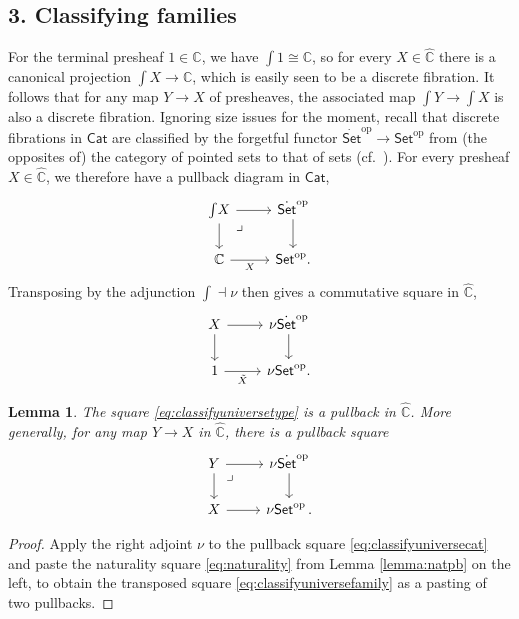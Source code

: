 \documentclass[11pt]{article}
\newcommand{\C}{\ensuremath{\mathbb{C}}}
\newcommand{\op}[1]{\ensuremath{{#1}^{\mathrm{op}}}}
\newcommand{\Set}{\ensuremath{\mathsf{Set}}}
\newcommand{\Cat}{\ensuremath{\mathsf{Cat}}}
\newcommand{\ra}{\ensuremath{\rightarrow}}
\renewcommand{\to}{\ensuremath{\rightarrow}}
\newcommand{\elem}[1]{\textstyle\int\!{#1}}
\newcommand{\pbmark}{\ar[dr, phantom, "\lrcorner" very near start, shift right=.5ex]}	%
\newtheorem{lemma}[theorem]{Lemma}
\theoremstyle{remark}
\theoremstyle{definition}
\begin{document}
\subsection*{3. Classifying families}

For the terminal presheaf $1\in\widehat{\C}$, we have $\elem{1} \cong\C$, so for every $X\in\widehat{\C}$ there is a canonical projection  $\elem X \ra\C$, which is easily seen to be a discrete fibration.  It follows that for any map $Y\to X$ of presheaves, the associated map $\elem Y \to \elem X$ is also a discrete fibration. 
Ignoring size issues for the moment, recall that discrete fibrations in $\Cat$ are classified by the forgetful functor $\op{\dot{\Set}}\to \op{\Set}$ from (the opposites of) the category of pointed sets to that of sets (cf.~\cite{W:2007}).  For every presheaf $X\in\widehat{\C}$, we therefore have a pullback diagram in $\Cat$,
\begin{equation}\label{eq:classifyuniversecat}\textstyle
\begin{tikzcd}
	 \elem X \ar[d] \ar[r] \pbmark & \op{\dot{\Set}} \ar[d]\\  
	\C \ar[r,swap,"X"] &  \op{\Set}.
 \end{tikzcd}
 \end{equation}
 Transposing by the adjunction $\int\dashv \nu$ then gives a commutative square in $\widehat{\C}$,
\begin{equation}\label{eq:classifyuniversetype}\textstyle
\begin{tikzcd}
	 X \ar[d] \ar[r] & \nu\op{\dot{\Set}} \ar[d]\\  
	1 \ar[r,swap,"\tilde{X}"] &  \nu\op{\Set}.
 \end{tikzcd}
 \end{equation}

\begin{lemma}
The square \eqref{eq:classifyuniversetype} is a pullback in $\widehat{\C}$. More generally, for any map $Y\ra X$ in $\widehat{\C}$, there is a pullback square 
\begin{equation}\label{eq:classifyuniversefamily}\textstyle
\begin{tikzcd}
	 Y \ar[d] \pbmark \ar[r] & \nu\op{\dot{\Set}} \ar[d] \\  
	X \ar[r] &  \nu\op{\Set}\,.
 \end{tikzcd}
 \end{equation}
\end{lemma}

\begin{proof}
Apply the right adjoint $\nu$ to the pullback square \eqref{eq:classifyuniversecat} and paste the naturality square \eqref{eq:naturality} from Lemma \ref{lemma:natpb} on the left, to obtain the transposed square \eqref{eq:classifyuniversefamily} as a pasting of two pullbacks.
\end{proof}
\end{document}
